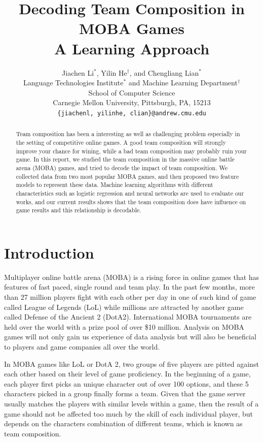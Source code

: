 \documentclass{article} %
\title{Decoding Team Composition in MOBA Games \\ A Learning Approach}
\author{
Jiachen Li$^*$, Yilin He$^\dag$, and Chengliang Lian$^*$\\
Language Technologies Institute$^*$ and Machine Learning Department$^\dag$ \\ School of Computer Science \\
Carnegie Mellon University, Pittsburgh, PA, 15213 \\
\texttt{\{jiachenl, yilinhe, clian\}@andrew.cmu.edu}
}
\begin{document}
\maketitle

\begin{abstract}
Team composition has been a interesting as well as challenging problem especially in the setting of competitive online games. A good team composition will strongly improve your chance for wining, while a bad team composition may probably ruin your game.
In this report, we studied the team composition in the massive online battle arena (MOBA) games, and tried to decode the impact of team composition. We collected data from two most popular MOBA games, and then proposed two feature models to represent these data. Machine learning algorithms with different characteristics such as logistic regression and neural networks are used to evaluate our works, and our current results shows that the team composition does have influence on game results and this relationship is decodable.
\end{abstract}

\section{Introduction}



Multiplayer online battle arena (MOBA) is a rising force in online games that has features of fast paced, single round and team play. In the past few months, more than 27 million players fight with each other per day in one of such kind of game called League of Legends (LoL)\cite{Ian} while millions are attracted by another game called Defense of the Ancient 2 (DotA2). International MOBA tournaments are held over the world with a prize pool of over \$10 million\cite{Valve}.  Analysis on MOBA games will not only gain us experience of data analysis but will also be beneficial to players and game companies all over the world.

In MOBA games like LoL or DotA 2, two groups of five players are pitted against each other based on their level of game proficiency. In the beginning of a game, each player first picks an unique character out of over 100 options, and these 5 characters picked in a group finally forms a team. Given that the game server usually matches the players with similar levels within a game, then the result of a game should not be affected too much by the skill of each individual player, but depends on the characters combination of different teams, which is known as team composition.
\end{document}
